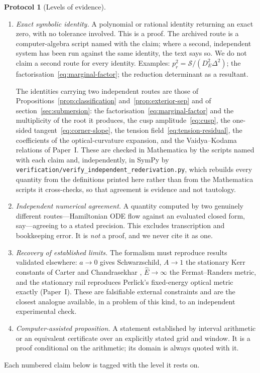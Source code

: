 \documentclass[12pt]{iopart}
\theoremstyle{plain}
\theoremstyle{definition}
\newtheorem{protocol}{Protocol}
\theoremstyle{remark}
\newcommand{\Ehat}{\hat E}
\begin{document}
\begin{protocol}[Levels of evidence]
\label{prot:evidence}
\begin{enumerate}
\item[\rm(I)] \emph{Exact symbolic identity.} A polynomial or rational identity
returning an exact zero, with no tolerance involved. This is a proof. The archived
route is a computer-algebra script named with the claim; where a second, independent
system has been run against the same identity, the text says so. We do not claim a
second route for every identity. Examples: $p_r^2=\mathcal S/(D_E^2\Delta^2)$;
the factorisation~\eqref{eq:marginal-factor}; the reduction determinant as a
resultant.

The identities carrying two independent routes are those of
Propositions~\ref{prop:classification} and~\ref{prop:exterior-sep} and of
section~\ref{sec:submersion}: the factorisation~\eqref{eq:marginal-factor} and the
multiplicity of the root it produces, the cusp amplitude~\eqref{eq:cusp}, the
one-sided tangent~\eqref{eq:corner-slope}, the tension
field~\eqref{eq:tension-residual}, the coefficients of the optical-curvature
expansion, and the Vaidya--Kodama relations of Paper~I. These are checked in
Mathematica by the scripts named with each claim and, independently, in SymPy by
\texttt{verification/verify\_independent\_rederivation.py}, which rebuilds every
quantity from the definitions printed here rather than from the Mathematica scripts
it cross-checks, so that agreement is evidence and not tautology.
\item[\rm(II)] \emph{Independent numerical agreement.} A quantity computed by
two genuinely different routes---Hamiltonian ODE flow against an evaluated
closed form, say---agreeing to a stated precision. This excludes transcription
and bookkeeping error. It is \emph{not} a proof, and we never cite it as one.
\item[\rm(III)] \emph{Recovery of established limits.} The formalism must
reproduce results validated elsewhere: $a\to0$ gives Schwarzschild, $A\to1$ the
stationary Kerr constants of Carter and Chandrasekhar
\cite{Carter1968,Chandrasekhar}, $\Ehat\to\infty$ the Fermat--Randers metric,
and the stationary rail reproduces Perlick's fixed-energy optical metric
\cite{Perlick1991} exactly (Paper~I). These are falsifiable external constraints
and are the closest analogue available, in a problem of this kind, to an
independent experimental check.
\item[\rm(IV)] \emph{Computer-assisted proposition.} A statement established by
interval arithmetic or an equivalent certificate over an explicitly stated grid
and window. It is a proof conditional on the arithmetic; its domain is always
quoted with it.
\end{enumerate}
Each numbered claim below is tagged with the level it rests on.
\end{protocol}
\end{document}
